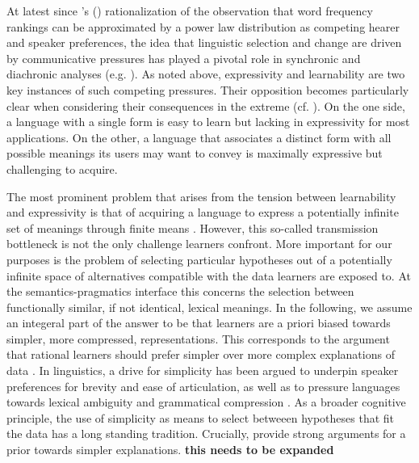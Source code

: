 \documentclass[a4paper]{article}
\newcommand{\citeposs}[2][]{\citeauthor{#2}'s (\citeyear[#1]{#2})}
\newcommand{\hl}[1]{\textcolor[rgb]{.8,.33,.0}{#1}}%
\begin{document}
At latest since \citeposs{zipf:1949} rationalization of the observation that word frequency rankings can be approximated by a power law distribution as competing hearer and speaker preferences, the idea that linguistic selection and change are driven by communicative pressures has played a pivotal role in synchronic and diachronic analyses (e.g. \citealt{martinet:1962, horn:1984,jaeger+vRooij:2007,jaeger:2007, piantadosi:2014,kirby+etal:2015}). As noted above, expressivity and learnability are two key instances of such competing pressures. Their opposition becomes particularly clear when considering their consequences in the extreme (cf. \citealt{kemp+regier:2012,kirby+etal:2015}). On the one side, a language with a single form is easy to learn but lacking in expressivity for most applications. On the other, a language that associates a distinct form with all possible meanings its users may want to convey is maximally expressive but challenging to acquire.

The most prominent problem that arises from the tension between learnability and expressivity is that of acquiring a language to express a potentially infinite set of meanings through finite means \citep{kirby:2002}. However, this so-called transmission bottleneck is not the only challenge learners confront. More important for our purposes is the problem of selecting particular hypotheses out of a potentially infinite space of alternatives compatible with the data learners are exposed to. At the semantics-pragmatics interface this concerns the selection between functionally similar, if not identical, lexical meanings.  In the following, we assume an integeral part of the answer to be that learners are a priori biased towards simpler, more compressed, representations. This corresponds to the argument that rational learners should prefer simpler over more complex explanations of data \citep{feldman:2000, chater+vitanyi:2003, piantadosi+etal:2012a, kirby+etal:2015,piantadosi+etal:underreview}. In linguistics, a drive for simplicity has been argued to underpin speaker preferences for brevity and ease of articulation, as well as to pressure languages towards lexical ambiguity and grammatical compression \citep{zipf:1949,grice:1975,piantadosi+etal:2012, kirby+etal:2015}. \hl{As a broader cognitive principle, the use of simplicity as means to select betweeen hypotheses that fit the data has a long standing tradition. Crucially, \citet{chater+vitanyi:2003} provide strong arguments for a prior towards simpler explanations. {\bf this needs to be expanded}}
\end{document}
